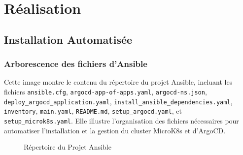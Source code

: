   \section{Réalisation}
  \subsection{Installation Automatisée}
  \subsubsection{Arborescence des fichiers d'Ansible}
  Cette image montre le contenu du répertoire du projet Ansible, incluant les fichiers \texttt{ansible.cfg}, \texttt{argocd-app-of-apps.yaml}, \texttt{argocd-ns.json}, \texttt{deploy\_argocd\_application.yaml}, \texttt{install\_ansible\_dependencies.yaml}, \texttt{inventory}, \texttt{main.yaml}, \texttt{README.md}, \texttt{setup\_argocd.yaml}, et \texttt{setup\_microk8s.yaml}. Elle illustre l'organisation des fichiers nécessaires pour automatiser l’installation et la gestion du cluster MicroK8s et d’ArgoCD.
  \newpage
  \begin{figure}[h]
      \vspace*{-1cm}
      \begin{adjustwidth}{-3.5cm}{-3.5cm}
      \centering
      \caption{Répertoire du Projet Ansible}
      \label{fig:ansible00}
      \end{adjustwidth}
  \end{figure}
